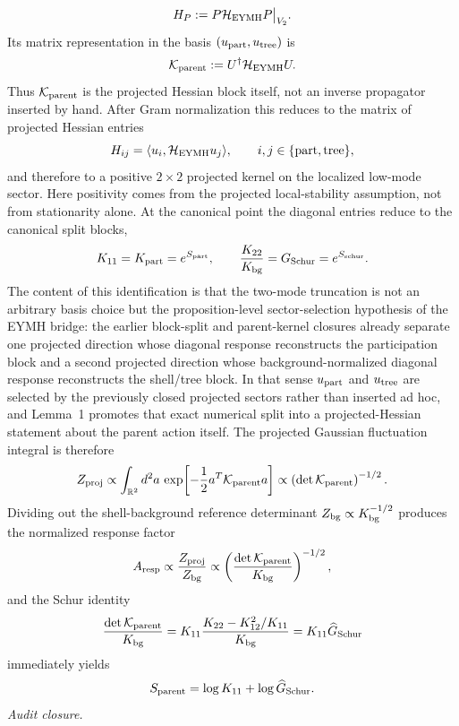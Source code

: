 \documentclass[aps,prd,onecolumn,notitlepage,nofootinbib,superscriptaddress,11pt,floatfix]{revtex4-2}
\begin{document}
\[
H_P:=P\mathcal H_{\rm EYMH}P\big|_{V_2}.
\]
Its matrix representation in the basis \((u_{\rm part},u_{\rm tree})\) is
\[
\mathcal K_{\rm parent}:=U^\dagger\mathcal H_{\rm EYMH}U.
\]
Thus \(\mathcal K_{\rm parent}\) is the projected Hessian block itself, not an inverse propagator inserted by hand. After Gram normalization this reduces to the matrix of projected Hessian entries
\[
H_{ij}=\langle u_i,\mathcal H_{\rm EYMH}u_j\rangle,
\qquad
i,j\in\{{\rm part},{\rm tree}\},
\]
and therefore to a positive \(2\times2\) projected kernel on the localized low-mode sector. Here positivity comes from the projected local-stability assumption, not from stationarity alone. At the canonical point the diagonal entries reduce to the canonical split blocks,
\[
K_{11}=K_{\rm part}=e^{S_{\rm part}},
\qquad
\frac{K_{22}}{K_{\rm bg}}=G_{\rm Schur}=e^{S_{\rm schur}}.
\]
The content of this identification is that the two-mode truncation is not an arbitrary basis choice but the proposition-level sector-selection hypothesis of the EYMH bridge: the earlier block-split and parent-kernel closures already separate one projected direction whose diagonal response reconstructs the participation block and a second projected direction whose background-normalized diagonal response reconstructs the shell/tree block. In that sense \(u_{\rm part}\) and \(u_{\rm tree}\) are selected by the previously closed projected sectors rather than inserted ad hoc, and Lemma~1 promotes that exact numerical split into a projected-Hessian statement about the parent action itself.
The projected Gaussian fluctuation integral is therefore
\[
Z_{\rm proj}
\propto
\int_{\mathbb R^2} d^2a\,
\exp\!\left[
-\frac12 a^T\mathcal K_{\rm parent}a
\right]
\propto
\left(\det \mathcal K_{\rm parent}\right)^{-1/2}.
\]
Dividing out the shell-background reference determinant \(Z_{\rm bg}\propto K_{\rm bg}^{-1/2}\) produces the normalized response factor
\[
A_{\rm resp}\propto \frac{Z_{\rm proj}}{Z_{\rm bg}}
\propto
\left(\frac{\det\mathcal K_{\rm parent}}{K_{\rm bg}}\right)^{-1/2},
\]
and the Schur identity
\[
\frac{\det\mathcal K_{\rm parent}}{K_{\rm bg}}
=
K_{11}\frac{K_{22}-K_{12}^2/K_{11}}{K_{\rm bg}}
=
K_{11}\widehat G_{\rm Schur}
\]
immediately yields
\[
S_{\rm parent}=\log K_{11}+\log\widehat G_{\rm Schur}.
\]
\emph{Audit closure.}
\end{document}
